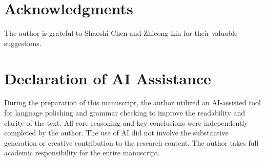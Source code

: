 \documentclass[11pt]{article}
\numberwithin{equation}{section}
\begin{document}



\section*{Acknowledgments} The author is grateful to Shaoshi Chen and Zhicong Lin for their valuable suggestions.

\section*{Declaration of AI Assistance}


During the preparation of this manuscript, the author utilized an AI-assisted tool for language polishing and grammar checking to improve the readability and clarity of the text. All core reasoning and key conclusions were independently completed by the author. The use of AI did not involve the substantive generation or creative contribution to the research content. The author takes full academic responsibility for the entire manuscript.




\end{document}
